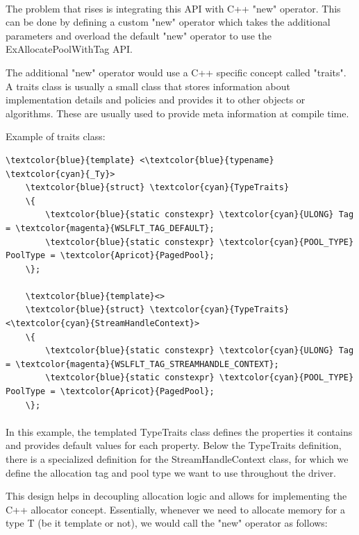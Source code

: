         \paragraph{}
        The problem that rises is integrating this API with C++ "new" operator. This can be done by defining a custom "new" operator which takes
        the additional parameters and overload the default "new" operator to use the ExAllocatePoolWithTag API.

        The additional "new" operator would use a C++ specific concept called "traits"\cite{EffectiveModernCpp}. A traits class is usually a small
        class that stores information about implementation details and policies and provides it to other objects or algorithms. These are usually
        used to provide meta information at compile time.

        Example of traits class:
\begin{Verbatim}[fontsize=\small, commandchars=\\\{\}]
    \textcolor{blue}{template} <\textcolor{blue}{typename} \textcolor{cyan}{_Ty}>
    \textcolor{blue}{struct} \textcolor{cyan}{TypeTraits}
    \{
        \textcolor{blue}{static constexpr} \textcolor{cyan}{ULONG} Tag = \textcolor{magenta}{WSLFLT_TAG_DEFAULT};
        \textcolor{blue}{static constexpr} \textcolor{cyan}{POOL_TYPE} PoolType = \textcolor{Apricot}{PagedPool};
    \};

    \textcolor{blue}{template}<>
    \textcolor{blue}{struct} \textcolor{cyan}{TypeTraits}<\textcolor{cyan}{StreamHandleContext}>
    \{
        \textcolor{blue}{static constexpr} \textcolor{cyan}{ULONG} Tag = \textcolor{magenta}{WSLFLT_TAG_STREAMHANDLE_CONTEXT};
        \textcolor{blue}{static constexpr} \textcolor{cyan}{POOL_TYPE} PoolType = \textcolor{Apricot}{PagedPool};
    \};
\end{Verbatim}

    \paragraph{}
    In this example, the templated TypeTraits class defines the properties it contains and provides default values for each property. Below the
    TypeTraits definition, there is a specialized definition for the StreamHandleContext class, for which we define the allocation tag and
    pool type we want to use throughout the driver.

    This design helps in decoupling allocation logic and allows for implementing the C++ allocator concept. Essentially, whenever we need to
    allocate memory for a type T (be it template or not), we would call the "new" operator as follows:

